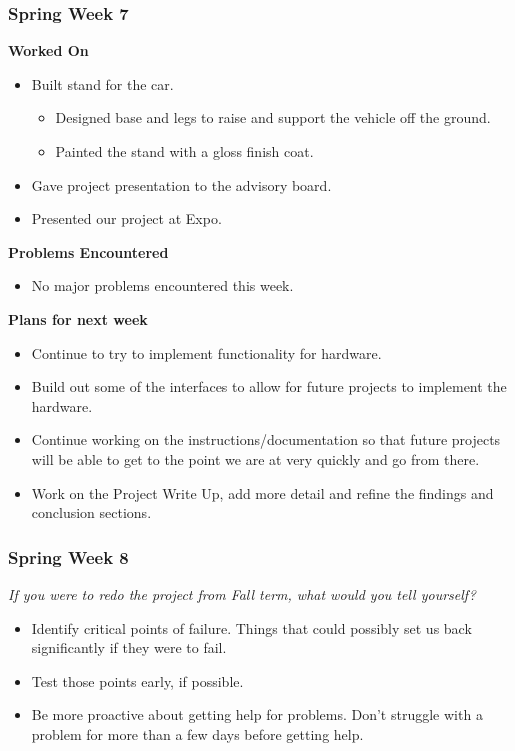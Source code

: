 \documentclass[compsoc,draftclsnofoot,onecolumn,10pt]{IEEEtran}
\begin{document}
\subsubsection*{Spring Week 7}
\textbf{Worked On}
\begin{itemize}
    \item Built stand for the car.
    \begin{itemize}
        \item Designed base and legs to raise and support the vehicle off the ground.
        \item Painted the stand with a gloss finish coat.
    \end{itemize}
    \item Gave project presentation to the advisory board.
    \item Presented our project at Expo.
\end{itemize}

\textbf{Problems Encountered}
\begin{itemize}
    \item No major problems encountered this week.
\end{itemize}

\textbf{Plans for next week}
\begin{itemize}
    \item Continue to try to implement functionality for hardware.
    \item Build out some of the interfaces to allow for future projects to implement the hardware.
    \item Continue working on the instructions/documentation so that future projects will be able to get to the point we are at very quickly and go from there.
    \item Work on the Project Write Up, add more detail and refine the findings and conclusion sections.
\end{itemize}


\subsubsection*{Spring Week 8}

\textit{If you were to redo the project from Fall term, what would you tell yourself?}
\begin{itemize}
    \item Identify critical points of failure. Things that could possibly set us back significantly if they were to fail.
    \item Test those points early, if possible.
    \item Be more proactive about getting help for problems. Don't struggle with a problem for more than a few days before getting help.
\end{itemize}
\end{document}
